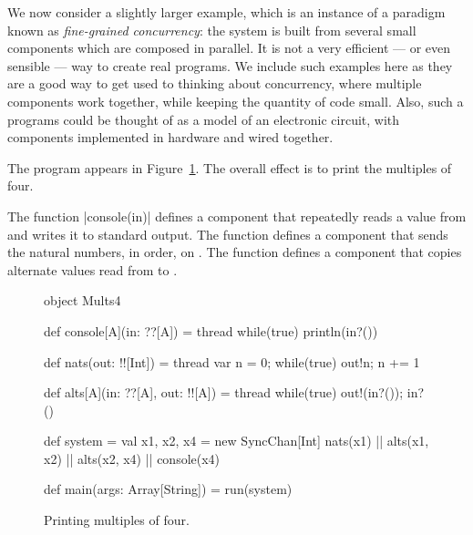 We now consider a slightly larger example, which is an instance of a paradigm
known as \emph{fine-grained concurrency}: the system is built from several
small components which are composed in parallel.  It is not a very efficient
--- or even sensible --- way to create real programs.  We include such
examples here as they are a good way to get used to thinking about
concurrency, where multiple components work together, while keeping the
quantity of code small.  Also, such a programs could be thought of as a model
of an electronic circuit, with components implemented in hardware and wired
together.

The program appears in Figure~\ref{fig:Mults4}. The overall effect is to print
the multiples of four.

The function |console(in)| defines a component that repeatedly reads a value
from  and writes it to standard output.  The function
 defines a component that sends the natural numbers, in
order, on .  The function  defines a component
that copies alternate values read from  to .


\begin{figure}
\begin{scala}
object Mults4{
  def console[A](in: ??[A]) = thread{ while(true) println(in?()) }

  def nats(out: !![Int]) = thread{ 
    var n = 0; while(true){ out!n; n += 1 }
  }

  def alts[A](in: ??[A], out: !![A]) = thread{ 
    while(true){ out!(in?()); in?() } 
  }

  def system = {
    val x1, x2, x4 = new SyncChan[Int]
    nats(x1) || alts(x1, x2) || alts(x2, x4) || console(x4)
  }

  def main(args: Array[String]) = run(system)
}
\end{scala}
\caption{Printing multiples of four.}
\label{fig:Mults4}
\end{figure}


